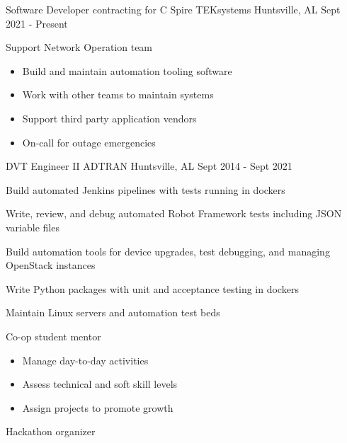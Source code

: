 
\begin{cventries}
  \cventry
    {Software Developer contracting for C Spire} %
    {TEKsystems } %
    {Huntsville, AL} %
    {Sept 2021 - Present} %
    {
      \begin{cvitems} %
        \item {Support Network Operation team}
            \begin{itemize}
                \item {Build and maintain automation tooling software}
                \item {Work with other teams to maintain systems}
                \item {Support third party application vendors}
                \item {On-call for outage emergencies}
            \end{itemize}
      \end{cvitems}
    }

  \cventry
    {DVT Engineer II} %
    {ADTRAN} %
    {Huntsville, AL} %
    {Sept 2014 - Sept 2021} %
    {
      \begin{cvitems} %
        \item {Build automated Jenkins pipelines with tests running in dockers}
        \item {Write, review, and debug automated Robot Framework tests including JSON variable files}
        \item {Build automation tools for device upgrades, test debugging, and managing OpenStack instances}
        \item {Write Python packages with unit and acceptance testing in dockers}
        \item {Maintain Linux servers and automation test beds}
        \item {Co-op student mentor}
            \begin{itemize}
                \item {Manage day-to-day activities}
                \item {Assess technical and soft skill levels}
                \item {Assign projects to promote growth}
            \end{itemize}
        \item {Hackathon organizer}
      \end{cvitems}
    }


\end{cventries}
